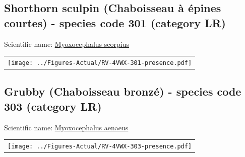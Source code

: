 \documentclass[12pt]{article}\usepackage[]{graphicx}\usepackage[]{color}
\begin{document}
\hypertarget{sec:301}{%
\subsection{Shorthorn sculpin (Chaboisseau à épines courtes) - species code 301 (category LR)}\label{sec:301}}

  


Scientific name: \href{http://www.marinespecies.org/aphia.php?p=taxdetails\&id=127203}{Myoxocephalus scorpius} \newline
\begin{minipage}{1.0\textwidth}
 \begin{tabular}{c}
\texttt{[image: ../Figures-Actual/RV-4VWX-301-presence.pdf]} \\ 
\end{tabular} 
\end{minipage}
\clearpage

\renewcommand\thefigure{\thesubsection\Alph{figure}}

\setcounter{figure}{0}

\hypertarget{sec:303}{%
\subsection{Grubby (Chaboisseau bronzé) - species code 303 (category LR)}\label{sec:303}}

  


Scientific name: \href{http://www.marinespecies.org/aphia.php?p=taxdetails\&id=159519}{Myoxocephalus aenaeus} \newline
\begin{minipage}{1.0\textwidth}
 \begin{tabular}{c}
\texttt{[image: ../Figures-Actual/RV-4VWX-303-presence.pdf]} \\ 
\end{tabular} 
\end{minipage}
\clearpage

\renewcommand\thefigure{\thesubsection\Alph{figure}}

\setcounter{figure}{0}
\end{document}
